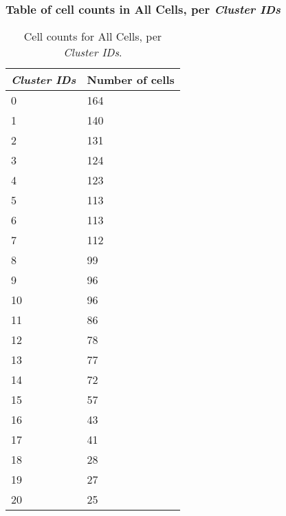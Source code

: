 \subsubsection{Table of cell counts in All Cells, per \emph{Cluster IDs}}\begin{table}[h]
\centering
\label{my-label}
\begin{tabular}{@{}ll@{}}
\toprule

\emph{Cluster IDs}& Number of cells \\ \midrule
0 & 164 \\

1 & 140 \\

2 & 131 \\

3 & 124 \\

4 & 123 \\

5 & 113 \\

6 & 113 \\

7 & 112 \\

8 & 99 \\

9 & 96 \\

10 & 96 \\

11 & 86 \\

12 & 78 \\

13 & 77 \\

14 & 72 \\

15 & 57 \\

16 & 43 \\

17 & 41 \\

18 & 28 \\

19 & 27 \\

20 & 25 \\
\bottomrule
\end{tabular}
\caption{Cell counts for All Cells, per \emph{Cluster IDs}.}
\end{table}

